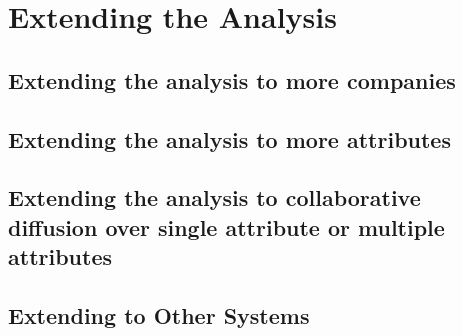 
\chapter{Extending the Analysis} %

\label{Chapter6} %



\section{Extending the analysis to more companies}



\section{Extending the analysis to more attributes}


\section{Extending the analysis to collaborative diffusion over single attribute or multiple attributes}


\section{Extending to Other Systems}